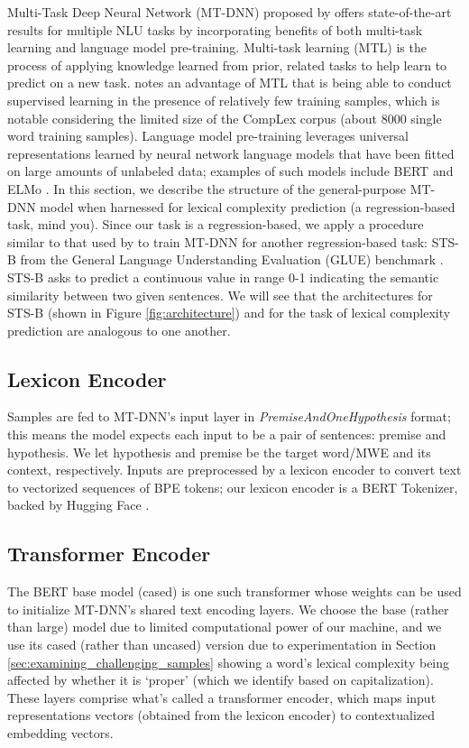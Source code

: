 \documentclass{dcthesis}
\theoremstyle{definition}
\theoremstyle{remark}
\begin{document}
Multi-Task Deep Neural Network (MT-DNN) proposed by \citet{liu2019multi} offers state-of-the-art results for multiple NLU tasks by incorporating benefits of both multi-task learning and language model pre-training. Multi-task learning (MTL) is the process of applying knowledge learned from prior, related tasks to help learn to predict on a new task. \citet{liu2019multi} notes an advantage of MTL that is being able to conduct supervised learning in the presence of relatively few training samples, which is notable considering the limited size of the CompLex corpus (about 8000 single word training samples). Language model pre-training leverages universal representations learned by neural network language models that have been fitted on large amounts of unlabeled data; examples of such models include BERT \citep{devlin2018bert} and ELMo \citep{peters2018deep}. In this section, we describe the structure of the general-purpose MT-DNN model when harnessed for lexical complexity prediction (a regression-based task, mind you). Since our task is a regression-based, we apply a procedure similar to that used by \citet{liu2019multi} to train MT-DNN for another regression-based task: STS-B from the General Language Understanding Evaluation (GLUE) benchmark \citep{wang2018glue}. STS-B asks to predict a continuous value in range 0-1 indicating the semantic similarity between two given sentences. We will see that the architectures for STS-B (shown in Figure \ref{fig:architecture}) and for the task of lexical complexity prediction are analogous to one another.

\subsection{Lexicon Encoder}

Samples are fed to MT-DNN's input layer in \textit{PremiseAndOneHypothesis} format; this means the model expects each input to be a pair of sentences: premise and hypothesis. We let hypothesis and premise be the target word/MWE and its context, respectively. Inputs are preprocessed by a lexicon encoder to convert text to vectorized sequences of BPE tokens; our lexicon encoder is a BERT Tokenizer, backed by Hugging Face \citep{wolf2020transformers}.

\subsection{Transformer Encoder}

The BERT base model (cased) is one such transformer whose weights can be used to initialize MT-DNN's shared text encoding layers. We choose the base (rather than large) model due to limited computational power of our machine, and we use its cased (rather than uncased) version due to experimentation in Section \ref{sec:examining_challenging_samples} showing a word's lexical complexity being affected by whether it is `proper' (which we identify based on capitalization). These layers comprise what's called a transformer encoder, which maps input representations vectors (obtained from the lexicon encoder) to contextualized embedding vectors.
\end{document}
